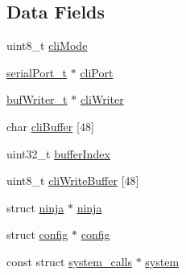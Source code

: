 \subsection*{Data Fields}
\begin{DoxyCompactItemize}
\item 
uint8\+\_\+t \hyperlink{structcli_ad883330782b8c855b0eaa1abaedcc86b}{cli\+Mode}
\item 
\hyperlink{drivers_2serial_8h_a64a5e2f04e1a908fbb1b3b165f88e0ef}{serial\+Port\+\_\+t} $\ast$ \hyperlink{structcli_a85b16acbd50c30e8d3e449efa2c3fcc9}{cli\+Port}
\item 
\hyperlink{buf__writer_8h_af353d11f86cf78bbfa82c614d2d9cdcf}{buf\+Writer\+\_\+t} $\ast$ \hyperlink{structcli_af2978c71af4c89cf058e8e7b673544cf}{cli\+Writer}
\item 
char \hyperlink{structcli_ae699dbfab6c1a5a30760d24ee80c4711}{cli\+Buffer} \mbox{[}48\mbox{]}
\item 
uint32\+\_\+t \hyperlink{structcli_a01cf4b2b835607c41a38fc49cbff6753}{buffer\+Index}
\item 
uint8\+\_\+t \hyperlink{structcli_ac85aeb6daff7de2127cf8fe74e170f29}{cli\+Write\+Buffer} \mbox{[}48\mbox{]}
\item 
struct \hyperlink{structninja}{ninja} $\ast$ \hyperlink{structcli_a980bb0b8ad40cdc259b0534ae257ef6f}{ninja}
\item 
struct \hyperlink{structconfig}{config} $\ast$ \hyperlink{structcli_a28dc99e6c98ca10ed948568b73c70895}{config}
\item 
const struct \hyperlink{structsystem__calls}{system\+\_\+calls} $\ast$ \hyperlink{structcli_ab655c84a74f70154b6ad959f3d3e42f9}{system}
\end{DoxyCompactItemize}


